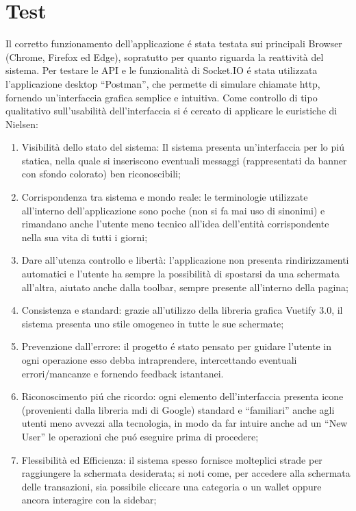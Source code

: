 \documentclass{report}
\begin{document}
\section{Test}
Il corretto funzionamento dell’applicazione é stata testata sui principali Browser (Chrome, Firefox ed Edge), sopratutto per quanto riguarda la reattività del sistema.
\newline \newline
Per testare le API e le funzionalità di Socket.IO é stata utilizzata l’applicazione desktop “Postman”, che permette di simulare chiamate http, fornendo un’interfaccia grafica semplice e intuitiva.
\newline \newline
Come controllo di tipo qualitativo sull’usabilità dell’interfaccia si é cercato di applicare le euristiche di Nielsen:
\begin{enumerate}
    \item Visibilità dello stato del sistema: Il sistema presenta un’interfaccia per lo piú statica, nella quale si inseriscono eventuali messaggi (rappresentati da banner con sfondo colorato) ben riconoscibili;
    \item Corrispondenza tra sistema e mondo reale: le terminologie utilizzate all’interno dell’applicazione sono poche (non si fa mai uso di sinonimi) e rimandano anche l’utente meno tecnico all’idea dell’entità corrispondente nella sua vita di tutti i giorni;
    \item Dare all’utenza controllo e libertà: l’applicazione non presenta rindirizzamenti automatici e l’utente ha sempre la possibilità di spostarsi da una schermata all’altra, aiutato anche dalla toolbar, sempre presente all’interno della pagina;
    \item Consistenza e standard: grazie all’utilizzo della libreria grafica Vuetify 3.0, il sistema presenta uno stile omogeneo in tutte le sue schermate;
    \item Prevenzione dall’errore: il progetto é stato pensato per guidare l’utente in ogni operazione esso debba intraprendere, intercettando eventuali errori/mancanze e fornendo feedback istantanei.
    \item Riconoscimento piú che ricordo: ogni elemento dell’interfaccia presenta icone (provenienti dalla libreria mdi di Google) standard e “familiari” anche agli utenti meno avvezzi alla tecnologia, in modo da far intuire anche ad un “New User” le operazioni che puó eseguire prima di procedere;
    \item Flessibilità ed Efficienza: il sistema spesso fornisce molteplici strade per raggiungere la schermata desiderata; si noti come, per accedere alla schermata delle transazioni, sia possibile cliccare una categoria o un wallet oppure ancora interagire con la sidebar;

\end{enumerate}
\end{document}
